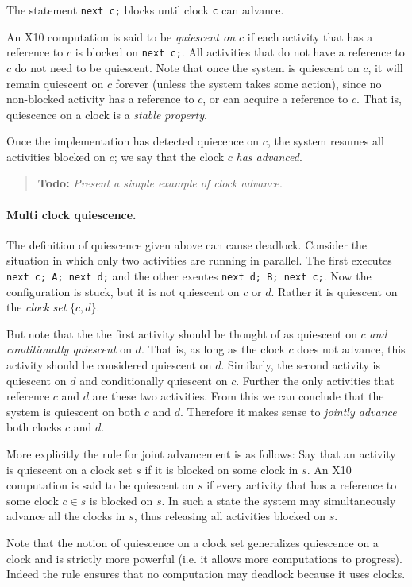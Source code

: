 \documentclass{article}
\def\ccfont{\sf}
\def\X10{{\ccfont X10}}
\newcommand \todo[1] {\begin{quotation}{\bf Todo:} {\footnotesize\em #1}\end{quotation}}
\begin{document}
The statement {\tt next c;} blocks until clock {\tt c} can advance.

An \X10{} computation is said to be {\em quiescent on $c$} if each
activity that has a reference to $c$ is blocked on {\tt next c;}.
All activities that do not have a reference to $c$ do not need to
be quiescent. Note that once the system is quiescent on $c$, it
will remain quiescent on $c$ forever (unless the system takes some
action), since no non-blocked activity has a reference to $c$,
or can acquire a reference to $c$. That is,  quiescence on 
a clock is a {\em stable property}. 

Once the implementation has detected quiecence on $c$, the system
resumes all activities blocked on $c$; we say that the clock $c$ {\em
has advanced}.

\todo{Present a simple example of clock advance.}
\paragraph{Multi clock quiescence.}
The definition of quiescence given above can cause deadlock. Consider
the situation in which only two activities are running in
parallel. The first executes {\tt next c; A; next d;} and the other
exeutes {\tt next d; B; next c;}. Now the configuration is stuck, but
it is not quiescent on $c$ or $d$. Rather it is quiescent on the
{\em clock set} $\{c, d\}$.

But note that the the first activity should be thought of as quiescent
on $c$ {\em and} {\em conditionally quiescent} on $d$. That is, as
long as the clock $c$ does not advance, this activity should be
considered quiescent on $d$. Similarly, the second activity is
quiescent on $d$ and conditionally quiescent on $c$. Further the only
activities that reference $c$ and $d$ are these two activities. From
this we can conclude that the system is quiescent on both $c$ and
$d$. Therefore it makes sense to {\em jointly advance} both clocks $c$
and $d$. 

More explicitly the rule for joint advancement is as follows: Say that
an activity is quiescent on a clock set $s$ if it is blocked on some
clock in $s$. An \X10{} computation is said to be quiescent on $s$ if
every activity that has a reference to some clock $c \in s$ is blocked
on $s$.  In such a state the system may simultaneously advance all the
clocks in $s$, thus releasing all activities blocked on $s$.

Note that the notion of quiescence on a clock set generalizes
quiescence on a clock and is strictly more powerful (i.e.{} it
allows more computations to progress). Indeed the rule ensures that no
computation may deadlock because it uses clocks.
\end{document}
